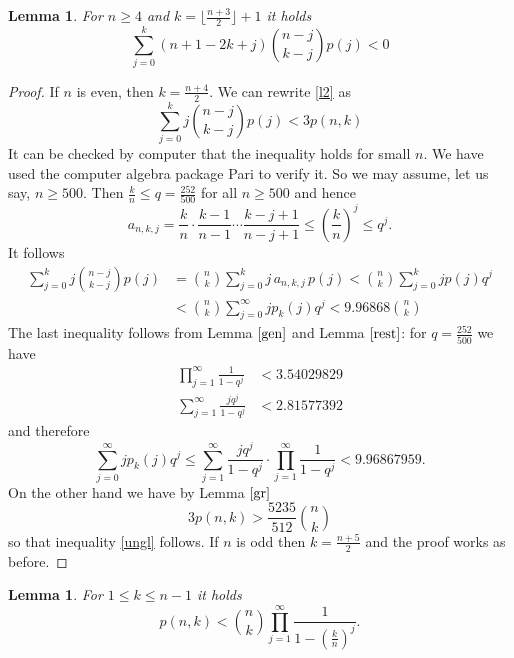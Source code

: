 \documentclass[12pt]{amsart}
\newtheorem{lem}[thm]{Lemma}
\theoremstyle{definition}
\theoremstyle{remark}
\begin{document}
\begin{lem}\label{rechts}
For $n\ge 4$ and $k=\lfloor\frac{n+3}{2}\rfloor + 1$ it holds
\begin{equation}\label{l2}
\sum_{j=0}^k (n+1-2k+j)\binom{n-j}{k-j}p(j)<0
\end{equation}
\end{lem} 
\begin{proof}
If $n$ is even, then $k=\frac{n+4}{2}$.
We can rewrite \eqref{l2} as
\begin{equation}\label{ungl}
\sum_{j=0}^k j\binom{n-j}{k-j}p(j)<3 p(n,k)
\end{equation}
It can be checked by computer that the inequality holds
for small $n$. We have used the computer algebra package Pari to verify it.
So we may assume, let us say, $n\ge 500$. Then $\frac{k}{n}\le q=\frac{252}{500}$
for all $n\ge 500$ and hence
\begin{equation*}
a_{n,k,j}  =\frac{k}{n}\cdot \frac{k-1}{n-1}\cdots \frac{k-j+1}{n-j+1}\le \left(\frac{k}{n}\right)^j \le q^j.
\end{equation*}
It follows
\begin{align*} 
\sum_{j=0}^k j\binom{n-j}{k-j}p(j)& =\binom{n}{k}\sum_{j=0}^{k} j\, a_{n,k,j} \, p(j)  < 
\binom{n}{k}\sum_{j=0}^{k} j p(j)q^j \\
& < \binom{n}{k}\sum_{j=0}^{\infty} j p_k(j)q^j <9.96868 \binom{n}{k}
\end{align*} 
The last inequality follows from Lemma $\ref{gen}$ and Lemma $\ref{rest}$:
for $q=\frac{252}{500}$ we have
\begin{align*}
\prod_{j=1}^{\infty} \frac{1}{1-q^j} & < 3.54029829 \\
\sum_{j=1}^{\infty}\frac{jq^j}{1-q^j} & < 2.81577392
\end{align*}
and therefore
\begin{equation*}
\sum_{j=0}^{\infty} j p_k(j)q^j\le
\sum_{j=1}^{\infty}\frac{jq^j}{1-q^j}\cdot \prod_{j=1}^{\infty}
\frac{1}{1-q^j} < 9.96867959.
\end{equation*}
On the other hand we have by Lemma $\ref{gr}$
\begin{equation*}
3p(n,k)>\frac{5235}{512}\binom{n}{k}
\end{equation*}
so that inequality \eqref{ungl} follows. If $n$ is odd then $k=\frac{n+5}{2}$ and the
proof works as before.
\end{proof}

\begin{lem}
For $1\le k\le n-1$ it holds
\begin{equation}
p(n,k)<\binom{n}{k}\prod_{j=1}^{\infty} \frac{1}{1-(\frac{k}{n})^j}.
\end{equation}
\end{lem}
\end{document}
